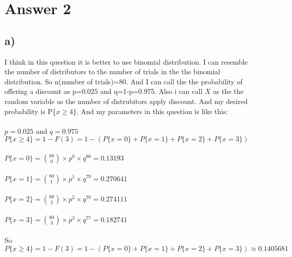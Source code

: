 \documentclass[12pt]{article}
\begin{document}
\section*{Answer 2}

\subsection*{a)}
I think in this question it is better to use binomial distribution. I can resemble the number of distributors to the number of trials in the the binomial distribution. So n(number of trials)=80. And I can call the the probability of offering a discount as p=0.025 and q=1-p=0.975. Also i can call $X$ as the the random variable as the number of distrubitors apply discount. And my desired probability is P\{$x\geq4\}$. And my parameters in this question is like this:\\\\
$p=0.025$ and $q=0.975$\\
$P\{x\geq4\}=1-F(3)=1-(P\{x=0\}+P\{x=1\}+P\{x=2\}+P\{x=3\})$\\\\
$P\{x=0\}=\binom {80}{0}\times p^{0}\times q^{80}=0.13193$\\\\
$P\{x=1\}=\binom {80}{1}\times p^{1}\times q^{79}=0.270641$\\\\
$P\{x=2\}=\binom {80}{2}\times p^{2}\times q^{78}=0.274111$\\\\
$P\{x=3\}=\binom {80}{3}\times p^{3}\times q^{77}=0.182741$\\\\
So $P\{x\geq4\}=1-F(3)=1-(P\{x=0\}+P\{x=1\}+P\{x=2\}+P\{x=3\})\approx0.1405681$
\end{document}
